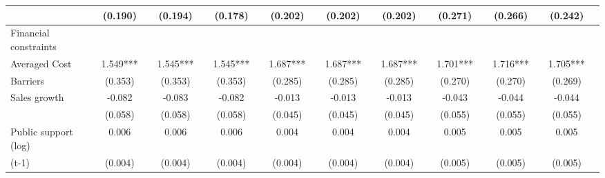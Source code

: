 \begin{table}[htbp]
\begin{tabular}{l*{18}{c}}
                    &     (0.190)   &               &     (0.194)   &               &     (0.178)   &               &     (0.202)   &               &     (0.202)   &               &     (0.202)   &               &     (0.271)   &               &     (0.266)   &               &     (0.242)   &               \\
\hline
Financial constraints&               &               &               &               &               &               &               &               &               &               &               &               &               &               &               &               &               &               \\
Averaged Cost       &       1.549***&               &       1.545***&               &       1.545***&               &       1.687***&               &       1.687***&               &       1.687***&               &       1.701***&               &       1.716***&               &       1.705***&               \\
Barriers            &     (0.353)   &               &     (0.353)   &               &     (0.353)   &               &     (0.285)   &               &     (0.285)   &               &     (0.285)   &               &     (0.270)   &               &     (0.270)   &               &     (0.269)   &               \\
Sales growth        &      -0.082   &               &      -0.083   &               &      -0.082   &               &      -0.013   &               &      -0.013   &               &      -0.013   &               &      -0.043   &               &      -0.044   &               &      -0.044   &               \\
                    &     (0.058)   &               &     (0.058)   &               &     (0.058)   &               &     (0.045)   &               &     (0.045)   &               &     (0.045)   &               &     (0.055)   &               &     (0.055)   &               &     (0.055)   &               \\
Public support (log)&       0.006   &               &       0.006   &               &       0.006   &               &       0.004   &               &       0.004   &               &       0.004   &               &       0.005   &               &       0.005   &               &       0.005   &               \\
(t-1)               &     (0.004)   &               &     (0.004)   &               &     (0.004)   &               &     (0.004)   &               &     (0.004)   &               &     (0.004)   &               &     (0.005)   &               &     (0.005)   &               &     (0.005)   &               \\

\end{tabular}
\end{table}
